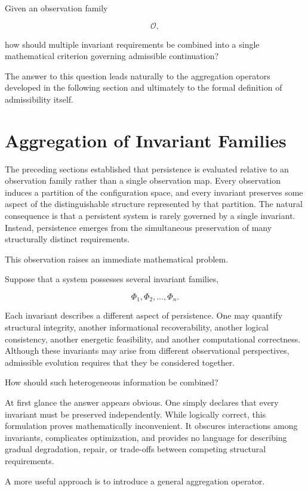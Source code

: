 \documentclass[11pt]{book}
\numberwithin{equation}{chapter}
\theoremstyle{definition}
\theoremstyle{plain}
\begin{document}
Given an observation family

\[
\mathcal O,
\]

how should multiple invariant requirements be combined into a single mathematical criterion governing admissible continuation?

The answer to this question leads naturally to the aggregation operators developed in the following section and ultimately to the formal definition of admissibility itself.

\section{Aggregation of Invariant Families}

The preceding sections established that persistence is evaluated relative to an observation family rather than a single observation map. Every observation induces a partition of the configuration space, and every invariant preserves some aspect of the distinguishable structure represented by that partition. The natural consequence is that a persistent system is rarely governed by a single invariant. Instead, persistence emerges from the simultaneous preservation of many structurally distinct requirements.

This observation raises an immediate mathematical problem.

Suppose that a system possesses several invariant families,

\[
\Phi_1,\Phi_2,\ldots,\Phi_n.
\]

Each invariant describes a different aspect of persistence. One may quantify structural integrity, another informational recoverability, another logical consistency, another energetic feasibility, and another computational correctness. Although these invariants may arise from different observational perspectives, admissible evolution requires that they be considered together.

How should such heterogeneous information be combined?

At first glance the answer appears obvious. One simply declares that every invariant must be preserved independently. While logically correct, this formulation proves mathematically inconvenient. It obscures interactions among invariants, complicates optimization, and provides no language for describing gradual degradation, repair, or trade-offs between competing structural requirements.

A more useful approach is to introduce a general aggregation operator.
\end{document}
